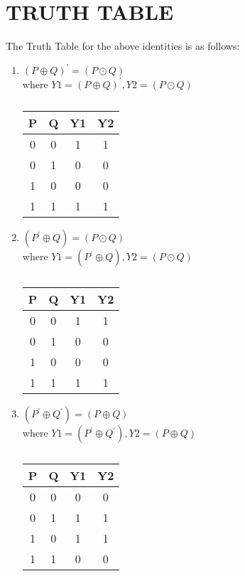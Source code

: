 \documentclass[a4paper,11pt,twocolumn]{article}
\begin{document}
\section{TRUTH TABLE}
The Truth Table for the above identities is as follows:
\begin{enumerate}[label=\textbf{(\Alph*})]
	\item \textbf{$ (P\oplus Q)^{\prime} = (P\odot Q)$} \\
where $Y1=(P\oplus Q)^{\prime}, Y2=(P\odot Q)$\\
\bigskip
\begin{table}[ht!]
	\centering
\begin{tabular}{ |c |c |c |c |} 
\hline 
\newline 
	\textbf{P} & \textbf{Q} & \textbf{Y1} & \textbf{Y2} \\ 
\hline
	0 & 0 &1 &1\\   
	0 & 1 &0 &0\\  
	1 & 0 &0 &0\\  
	1 & 1 &1 &1\\  
\hline 
\end{tabular}
	\caption{}
\end{table}
\bigskip
\bigskip

	\item \textbf{$(P^{\prime}\oplus Q)=(P\odot Q)$}\\
where $Y1=(P^{\prime}\oplus Q), Y2=(P\odot Q)$\\
\bigskip
\begin{table}[ht!]
	\centering
\begin{tabular}{ |c |c |c |c |} 
\hline 
\newline 
	\textbf{P} & \textbf{Q} & \textbf{Y1} & \textbf{Y2}\\
\hline  
	0 & 0 &1 &1\\   
	0 & 1 &0 &0\\ 
	1 & 0 &0 &0\\  
	1 & 1 &1 &1\\
\hline 
\end{tabular}
\caption{}
\end{table}
\bigskip

	\item \textbf{$(P^{\prime}\oplus Q^{\prime}) = (P\oplus Q)$} \\ where $Y1=(P^{\prime}\oplus Q^{\prime}), Y2=(P\oplus Q)$\\
\bigskip
\begin{table}[ht!]
	\centering
\begin{tabular}{ |c |c |c |c |} 
\hline 
\newline 
\textbf{P} & \textbf{Q} & \textbf{Y1} & \textbf{Y2}\\ 
\hline 
	0 & 0 &0 &0\\   
	0 & 1 &1 &1\\  
	1 & 0 &1 &1\\
	1 & 1 &0 &0\\
 \hline 
 \end{tabular}
	\caption{}
\end{table}
\bigskip


\end{enumerate}
\end{document}
